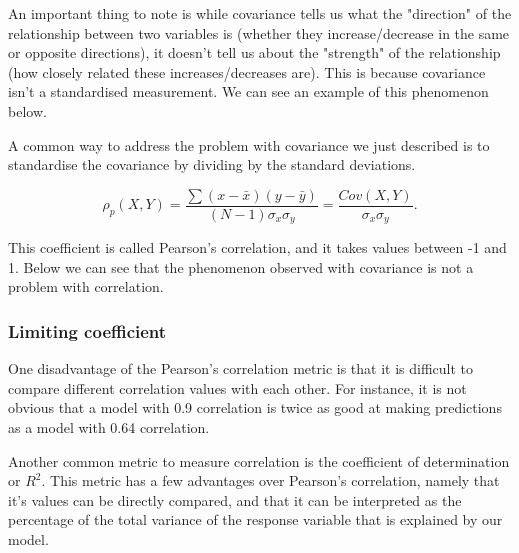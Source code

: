 An important thing to note is while covariance tells us what the "direction" of the relationship between two variables is (whether they increase/decrease in the same or opposite directions), it doesn't tell us about the "strength" of the relationship (how closely related these increases/decreases are). This is because covariance isn't a standardised measurement. We can see an example of this phenomenon below.

A common way to address the problem with covariance we just described is to standardise the covariance by dividing by the standard deviations.

\begin{equation}
\rho_{p}(X, Y) = \frac{\sum(x-\bar x)(y-\bar y)}{(N-1)\sigma_{x}\sigma_{y}}=\frac{Cov(X,Y)}{\sigma_{x}\sigma_{y}}.
\end{equation}

This coefficient is called Pearson's correlation, and it takes values between -1 and 1. Below we can see that the phenomenon observed with covariance is not a problem with correlation.

\subsubsection{Limiting coefficient}

One disadvantage of the Pearson's correlation metric is that it is difficult to compare different correlation values with each other. For instance, it is not obvious that a model with 0.9 correlation is twice as good at making predictions as a model with 0.64 correlation.

Another common metric to measure correlation is the coefficient of determination or $R^{2}$. This metric has a few advantages over Pearson's correlation, namely that it's values can be directly compared, and that it can be interpreted as the percentage of the total variance of the response variable that is explained by our model.

